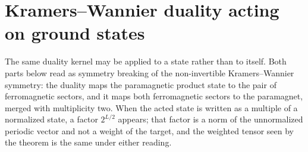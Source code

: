\section{Kramers--Wannier duality acting on ground states}%
\label{sec:asymex_kw_action}

The same duality kernel may be applied to a state rather than to itself.
Both parts below read as symmetry breaking of the non-invertible
Kramers--Wannier symmetry: the duality maps the paramagnetic product state
to the pair of ferromagnetic sectors, and it maps both ferromagnetic
sectors to the paramagnet, merged with multiplicity two. When the acted
state is written as a multiple of a normalized state, a factor $2^{L/2}$
appears; that factor is a norm of the unnormalized periodic vector and not
a weight of the target, and the weighted tensor seen by the theorem is the
same under either reading.

